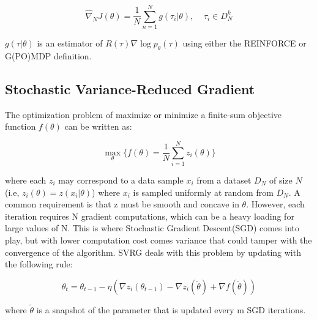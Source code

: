 \begin{equation}
  \label{eq:gradient estimate}
  \widehat{\nabla}_N J\left(\theta \right)=\frac{1}{N}\sum_{n=1}^N g(\tau_i|\theta),\;\;\;\;\tau_i \in D_N^k
\end{equation}

$g(\tau|\theta)$ is an estimator of $R(\tau) \nabla \log{p_\theta(\tau)}$ using either the REINFORCE or G(PO)MDP definition.

\subsection{ Stochastic Variance-Reduced Gradient}
\label{section:svrg}
The optimization problem of maximize or minimize a finite-sum objective function $f(\theta)$ can be written as:

\begin{equation}
  \label{eq:objective}
  \max_\theta\bigg\{f(\theta)=\frac{1}{N}\sum_{i=1}^N z_i(\theta)\bigg\}
\end{equation}

where each $z_i$ may correspond to a data sample $x_i$ from a dataset $D_N$ of size $N$ (i.e, $z_i(\theta) = z(x_i|\theta)$) where $x_i$ is sampled uniformly at random from $D_N$. A common requirement is that z must be smooth and concave in $\theta$. However, each iteration requires N gradient computations, which can be a heavy loading for large values of N. This is where  Stochastic Gradient Descent(SGD) comes into play, but with lower computation cost comes variance that could tamper with the convergence of the algorithm. SVRG deals with this problem by updating with the following rule:

\begin{equation}
  \label{eq:svrg}
  \theta_t = \theta_{t-1} - \eta \left(\nabla z_i(\theta_{t-1}) - \nabla z_i(\tilde{\theta}) + \nabla f(\tilde{\theta})\right)
\end{equation}

where $\tilde{\theta}$ is a snapshot of the parameter that is updated every m SGD iterations.

